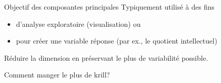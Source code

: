 \documentclass[
  ignorenonframetext,
]{beamer}
\providecommand{\tightlist}{%
  \setlength{\itemsep}{0pt}\setlength{\parskip}{0pt}}\usepackage{longtable,booktabs,array}
\begin{document}
\begin{frame}{Objectif des composantes principales}
\protect\hypertarget{objectif-des-composantes-principales}{}
Typiquement utilisé à des fins

\begin{itemize}
\tightlist
\item
  d'analyse exploratoire (visualisation) ou
\item
  pour créer une variable réponse (par ex., le quotient intellectuel)
\end{itemize}

Réduire la dimension en préservant le plus de variabilité possible.
\end{frame}

\begin{frame}{Comment manger le plus de krill?}
\protect\hypertarget{comment-manger-le-plus-de-krill}{}
\begin{figure}

\begin{minipage}[t]{0.50\linewidth}

{\centering 


}

\end{minipage}%
%
\begin{minipage}[t]{0.50\linewidth}

{\centering 

\raisebox{-\height}{

}}
\end{minipage}
\end{figure}
\end{frame}
\end{document}
